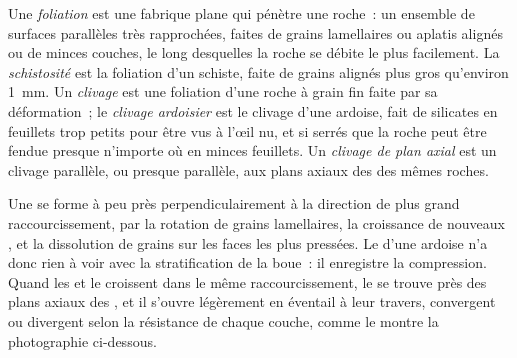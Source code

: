 \begin{definition}\label{def:b1:faults-folds-fabrics:foliation}
Une \emph{foliation} est une fabrique plane qui pénètre une roche~:
un ensemble de surfaces parallèles très rapprochées, faites de grains lamellaires ou aplatis alignés
ou de minces couches, le long desquelles la roche se débite le plus facilement.
La \emph{schistosité} est la foliation d'un schiste, faite de
grains alignés plus gros qu'environ \qty{1}{mm}. Un \emph{clivage} est
une foliation d'une roche à grain fin faite par sa déformation~;
le \emph{clivage ardoisier} est le clivage d'une ardoise, fait
de silicates en feuillets trop petits pour être vus à l'œil nu, et si serrés
que la roche peut être fendue presque n'importe où en minces feuillets. Un
\emph{clivage de plan axial} est un clivage parallèle, ou presque parallèle, aux plans axiaux
des  des mêmes roches.
\end{definition}

Une  se forme à peu près perpendiculairement à la direction de plus grand
raccourcissement, par la rotation de grains lamellaires, la croissance de nouveaux , et la
dissolution de grains sur les faces les plus pressées. Le 
d'une ardoise n'a donc rien à voir avec la stratification de la boue~: il enregistre la
compression. Quand les  et le  croissent dans le même raccourcissement, le 
se trouve près des plans axiaux des , et il s'ouvre légèrement en éventail à leur travers,
convergent ou divergent selon la résistance de chaque couche, comme le
montre la photographie ci-dessous.

